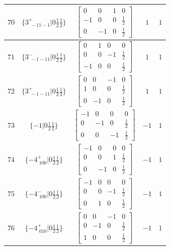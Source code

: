 \documentclass[fleqn,8pt]{jsarticle}
\begin{document}
\begin{longtable}{ccccc}
$ 70 $ & $ \{3^{+}_{\,\,-11-1}|0 \frac{1}{2} \frac{1}{2}\} $ & $ \begin{bmatrix} 0 & 0 & 1 & 0 \\ -1 & 0 & 0 & \frac{1}{2} \\ 0 & -1 & 0 & \frac{1}{2} \end{bmatrix} $ & $ 1 $ & $ 1 $ \\ \hline
$ 71 $ & $ \{3^{-}_{\,\,-1-11}|0 \frac{1}{2} \frac{1}{2}\} $ & $ \begin{bmatrix} 0 & 1 & 0 & 0 \\ 0 & 0 & -1 & \frac{1}{2} \\ -1 & 0 & 0 & \frac{1}{2} \end{bmatrix} $ & $ 1 $ & $ 1 $ \\ \hline
$ 72 $ & $ \{3^{+}_{\,\,-1-11}|0 \frac{1}{2} \frac{1}{2}\} $ & $ \begin{bmatrix} 0 & 0 & -1 & 0 \\ 1 & 0 & 0 & \frac{1}{2} \\ 0 & -1 & 0 & \frac{1}{2} \end{bmatrix} $ & $ 1 $ & $ 1 $ \\ \hline
$ 73 $ & $ \{-1|0 \frac{1}{2} \frac{1}{2}\} $ & $ \begin{bmatrix} -1 & 0 & 0 & 0 \\ 0 & -1 & 0 & \frac{1}{2} \\ 0 & 0 & -1 & \frac{1}{2} \end{bmatrix} $ & $ -1 $ & $ 1 $ \\ \hline
$ 74 $ & $ \{-4^{+}_{\,\,100}|0 \frac{1}{2} \frac{1}{2}\} $ & $ \begin{bmatrix} -1 & 0 & 0 & 0 \\ 0 & 0 & 1 & \frac{1}{2} \\ 0 & -1 & 0 & \frac{1}{2} \end{bmatrix} $ & $ -1 $ & $ 1 $ \\ \hline
$ 75 $ & $ \{-4^{-}_{\,\,100}|0 \frac{1}{2} \frac{1}{2}\} $ & $ \begin{bmatrix} -1 & 0 & 0 & 0 \\ 0 & 0 & -1 & \frac{1}{2} \\ 0 & 1 & 0 & \frac{1}{2} \end{bmatrix} $ & $ -1 $ & $ 1 $ \\ \hline
$ 76 $ & $ \{-4^{+}_{\,\,010}|0 \frac{1}{2} \frac{1}{2}\} $ & $ \begin{bmatrix} 0 & 0 & -1 & 0 \\ 0 & -1 & 0 & \frac{1}{2} \\ 1 & 0 & 0 & \frac{1}{2} \end{bmatrix} $ & $ -1 $ & $ 1 $ \\ \hline

\end{longtable}
\end{document}
